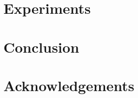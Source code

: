 \documentclass{article}
\begin{document}
\section{Experiments}
\label{sec:experiments}
\section{Conclusion}
\label{sec:conclusion}
\section*{Acknowledgements}







\appendix

\end{document}
